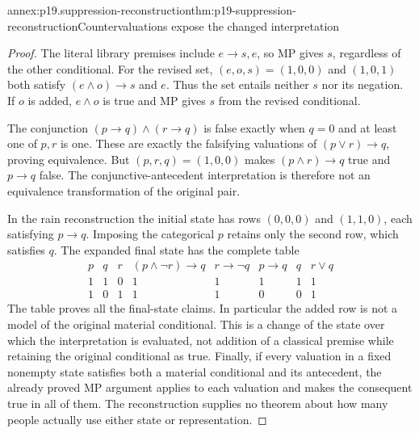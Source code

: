 \begin{annexitem}{annex:p19.suppression-reconstruction}{thm:p19-suppression-reconstruction}{Countervaluations expose the changed interpretation}
\begin{proof}
The literal library premises include \(e\to s,e\), so MP gives
\(s\), regardless of the other conditional. For the revised set,
\((e,o,s)=(1,0,0)\) and \((1,0,1)\) both satisfy
\((e\land o)\to s\) and \(e\). Thus the set entails neither
\(s\) nor its negation. If \(o\) is added, \(e\land o\) is true
and MP gives \(s\) from the revised conditional.

The conjunction \((p\to q)\land(r\to q)\) is false exactly when
\(q=0\) and at least one of \(p,r\) is one. These are exactly the
falsifying valuations of \((p\lor r)\to q\), proving equivalence.
But \((p,r,q)=(1,0,0)\) makes \((p\land r)\to q\) true and
\(p\to q\) false. The conjunctive-antecedent interpretation is
therefore not an equivalence transformation of the original pair.

In the rain reconstruction the initial state has rows \((0,0,0)\)
and \((1,1,0)\), each satisfying \(p\to q\). Imposing the
categorical \(p\) retains only the second row, which satisfies \(q\).
The expanded final state has the complete table
\[
\begin{array}{ccc|ccccc}
 p&q&r&(p\land\neg r)\to q&r\to\neg q&p\to q&q&r\lor q\\\hline
 1&1&0&1&1&1&1&1\\
 1&0&1&1&1&0&0&1
\end{array}
\]
The table proves all the final-state claims. In particular the added
row is not a model of the original material conditional. This is a
change of the state over which the interpretation is evaluated, not
addition of a classical premise while retaining the original conditional
as true. Finally, if every valuation in a fixed nonempty state satisfies
both a material conditional and its antecedent, the already proved MP
argument applies to each valuation and makes the consequent true in all
of them. The reconstruction supplies no theorem about how many people
actually use either state or representation.
\end{proof}
\end{annexitem}
